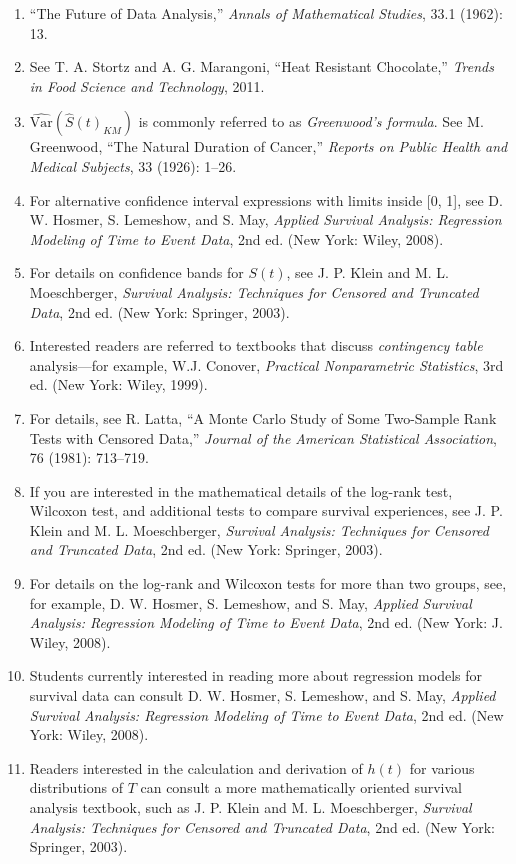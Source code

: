 \documentclass[
]{book}
\begin{document}
\begin{enumerate}

\item “The Future of Data Analysis,” \textit{Annals of Mathematical Studies}, 33.1 (1962): 13.
\item See T. A. Stortz and A. G. Marangoni, “Heat Resistant Chocolate,” \textit{Trends in Food Science and Technology}, 2011.
\item $\widehat{\text{Var}}(\widehat{S}(t)_{KM})$ is commonly referred to as \textit{Greenwood’s formula}. See M. Greenwood, “The Natural Duration of Cancer,” \textit{Reports on Public Health and Medical Subjects}, 33 (1926): 1–26.
\item For alternative confidence interval expressions with limits inside [0, 1], see D. W. Hosmer, S. Lemeshow, and S. May, \textit{Applied Survival Analysis: Regression Modeling of Time to Event Data}, 2nd ed. (New York: Wiley, 2008).
\item For details on confidence bands for $S(t)$, see J. P. Klein and M. L. Moeschberger, \textit{Survival Analysis: Techniques for Censored and Truncated Data}, 2nd ed. (New York: Springer, 2003).
\item Interested readers are referred to textbooks that discuss \textit{contingency table} analysis—for example, W.J. Conover, \textit{Practical Nonparametric Statistics}, 3rd ed. (New York: Wiley, 1999).
\item For details, see R. Latta, “A Monte Carlo Study of Some Two-Sample Rank Tests with Censored Data,” \textit{Journal of the American Statistical Association}, 76 (1981): 713–719.
\item If you are interested in the mathematical details of the log-rank test, Wilcoxon test, and additional tests to compare survival experiences, see J. P. Klein and M. L. Moeschberger, \textit{Survival Analysis: Techniques for Censored and Truncated Data}, 2nd ed. (New York: Springer, 2003).
\item For details on the log-rank and Wilcoxon tests for more than two groups, see, for example, D. W. Hosmer, S. Lemeshow, and S. May, \textit{Applied Survival Analysis: Regression Modeling of Time to Event Data}, 2nd ed. (New York: J. Wiley, 2008).
\item Students currently interested in reading more about regression models for survival data can consult D. W. Hosmer, S. Lemeshow, and S. May, \textit{Applied Survival Analysis: Regression Modeling of Time to Event Data}, 2nd ed. (New York: Wiley, 2008).
\item Readers interested in the calculation and derivation of $h(t)$ for various distributions of $T$ can consult a more mathematically oriented survival analysis textbook, such as J. P. Klein and M. L. Moeschberger, \textit{Survival Analysis: Techniques for Censored and Truncated Data}, 2nd ed. (New York: Springer, 2003).

\end{enumerate}
\end{document}

